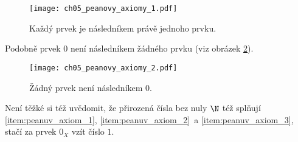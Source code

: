 \begin{figure}[H]
	\centering
	\texttt{[image: ch05\_peanovy\_axiomy\_1.pdf]}
    \caption{Každý prvek je následníkem právě jednoho prvku.}
    \label{fig:peanovy_axiomy_1}
\end{figure}
Podobně prvek $0$ není následníkem žádného prvku (viz obrázek \ref{fig:peanovy_axiomy_2}).
\begin{figure}[H]
	\centering
	\texttt{[image: ch05\_peanovy\_axiomy\_2.pdf]}
    \caption{Žádný prvek není následníkem 0.}
    \label{fig:peanovy_axiomy_2}
\end{figure}
Není těžké si též uvědomit, že přirozená čísla bez nuly $\N$ též splňují \ref{item:peanuv_axiom_1}, \ref{item:peanuv_axiom_2}~a \ref{item:peanuv_axiom_3}, stačí za prvek $0_X$ vzít číslo $1$.